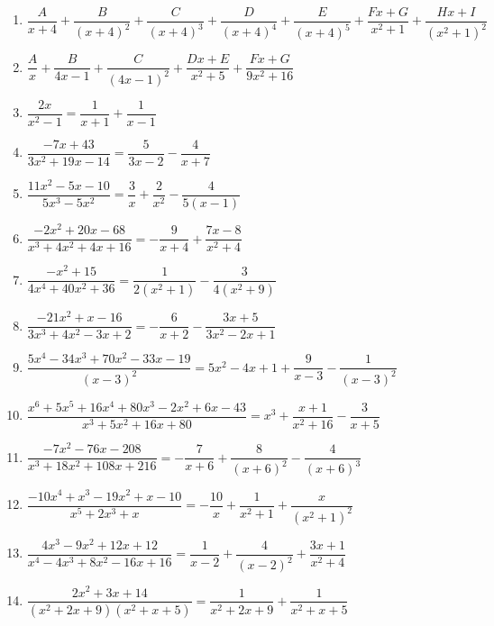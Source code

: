 \begin{enumerate}
\setcounter{enumi}{\value{HW}}

\item $\dfrac{A}{x + 4} + \dfrac{B}{(x + 4)^{2}} + \dfrac{C}{(x + 4)^{3}} + \dfrac{D}{(x + 4)^{4}} + \dfrac{E}{(x + 4)^{5}} + \dfrac{Fx + G}{x^{2} + 1} + \dfrac{Hx + I}{(x^{2} + 1)^{2}}$

\item $\dfrac{A}{x} + \dfrac{B}{4x - 1} + \dfrac{C}{(4x - 1)^{2}} + \dfrac{Dx + E}{x^{2} + 5} + \dfrac{Fx + G}{9x^{2} + 16}$

\item $\dfrac{2x}{x^{2} - 1} = \dfrac{1}{x + 1} + \dfrac{1}{x - 1}$
\item $\dfrac{-7x + 43}{3x^{2} + 19x - 14}= \dfrac{5}{3x - 2} - \dfrac{4}{x + 7}$
\item $\dfrac{11x^{2} - 5x - 10}{5x^{3} - 5x^{2}} = \dfrac{3}{x} + \dfrac{2}{x^{2}} - \dfrac{4}{5(x - 1)}$
\item $\dfrac{-2x^{2} + 20x - 68}{x^{3} + 4x^{2} + 4x + 16} = -\dfrac{9}{x + 4} + \dfrac{7x - 8}{x^{2} + 4}$
\item $\dfrac{-x^{2} + 15}{4x^{4} + 40x^{2} + 36} = \dfrac{1}{2(x^{2} + 1)} - \dfrac{3}{4(x^{2} + 9)}$
\item $\dfrac{-21x^{2} + x - 16}{3x^{3} + 4x^{2} - 3x + 2} = -\dfrac{6}{x + 2} - \dfrac{3x + 5}{3x^{2} - 2x + 1}$
\item $\dfrac{5x^{4} - 34x^{3} + 70x^{2} - 33x - 19}{(x - 3)^{2}} = 5x^{2} - 4x + 1 + \dfrac{9}{x - 3} - \dfrac{1}{(x - 3)^{2}}$
\item $\dfrac{x^{6} + 5x^{5} + 16x^{4} + 80x^{3} - 2x^{2} + 6x - 43}{x^{3} + 5x^{2} + 16x + 80} = x^{3} + \dfrac{x + 1}{x^{2} + 16} - \dfrac{3}{x + 5}$
\item $\dfrac{-7x^{2} - 76x - 208}{x^{3} + 18x^{2} + 108x + 216} = -\dfrac{7}{x + 6} + \dfrac{8}{(x + 6)^{2}} - \dfrac{4}{(x + 6)^{3}}$
\item $\dfrac{-10x^{4} + x^{3} - 19x^{2} + x - 10}{x^{5} + 2x^{3} + x} = -\dfrac{10}{x} + \dfrac{1}{x^{2} + 1} + \dfrac{x}{(x^{2} + 1)^{2}}$
\item $\dfrac{4x^{3} - 9x^{2} + 12x + 12}{x^{4} - 4x^{3} + 8x^{2} - 16x + 16}= \dfrac{1}{x - 2} + \dfrac{4}{(x - 2)^{2}} + \dfrac{3x + 1}{x^{2} + 4}$
\item $\dfrac{2x^{2} + 3x + 14}{(x^{2} + 2x + 9)(x^{2} + x + 5)} = \dfrac{1}{x^{2} + 2x + 9} + \dfrac{1}{x^{2} + x + 5}$

\end{enumerate}


\closegraphsfile